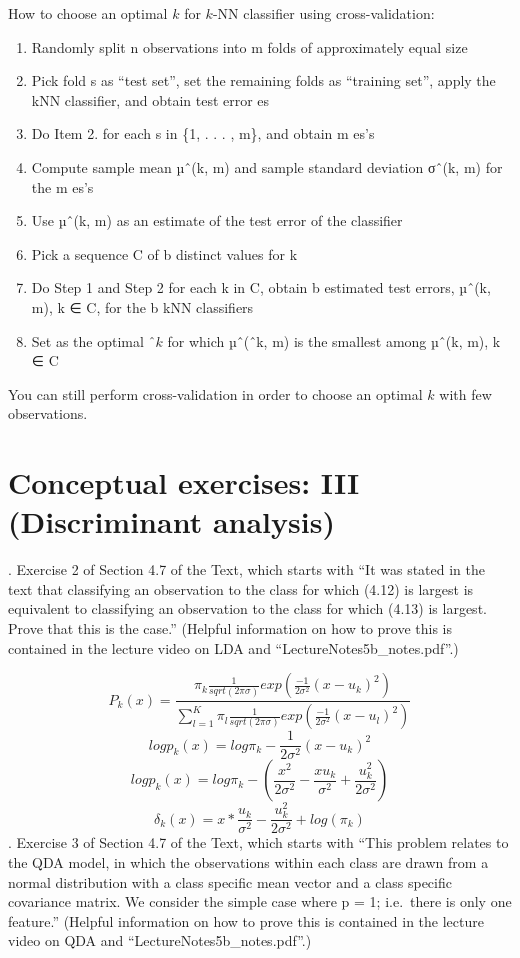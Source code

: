 \documentclass[
  11pt,
]{article}
\providecommand{\tightlist}{%
  \setlength{\itemsep}{0pt}\setlength{\parskip}{0pt}}
\begin{document}
How to choose an optimal \(k\) for \(k\)-NN classifier using
cross-validation:

\begin{enumerate}
\def\labelenumi{\arabic{enumi}.}
\tightlist
\item
  Randomly split n observations into m folds of approximately equal size
\item
  Pick fold s as ``test set'', set the remaining folds as ``training
  set'', apply the kNN classifier, and obtain test error es
\item
  Do Item 2. for each s in \{1, . . . , m\}, and obtain m es's
\item
  Compute sample mean µˆ(k, m) and sample standard deviation σˆ(k, m)
  for the m es's
\item
  Use µˆ(k, m) as an estimate of the test error of the classifier
\item
  Pick a sequence C of b distinct values for k
\item
  Do Step 1 and Step 2 for each k in C, obtain b estimated test errors,
  µˆ(k, m), k ∈ C, for the b kNN classifiers
\item
  Set as the optimal \(ˆk\) for which µˆ(ˆk, m) is the smallest among
  µˆ(k, m), k ∈ C
\end{enumerate}

You can still perform cross-validation in order to choose an optimal
\(k\) with few observations.

\hypertarget{conceptual-exercises-iii-discriminant-analysis}{%
\section{Conceptual exercises: III (Discriminant
analysis)}\label{conceptual-exercises-iii-discriminant-analysis}}

. Exercise 2 of Section 4.7 of the Text, which starts with ``It was
stated in the text that classifying an observation to the class for
which (4.12) is largest is equivalent to classifying an observation to
the class for which (4.13) is largest. Prove that this is the case.''
(Helpful information on how to prove this is contained in the lecture
video on LDA and ``LectureNotes5b\_notes.pdf''.)

\[P_k(x) = \frac{{\pi_k \frac{1}{sqrt(2\pi\sigma)}exp(\frac{-1}{2 \sigma^2}(x-u_k)^2)}} {\sum_{l = 1}^{K} \pi_l \frac{1}{sqrt(2\pi\sigma)}exp(\frac{-1}{2 \sigma^2}(x-u_l)^2)}\]
\[logp_k(x) = log\pi_k - \frac{1}{2\sigma^2} (x-u_k)^2\]
\[logp_k(x) = log\pi_k - (\frac{x^2}{2\sigma^2} - \frac{xu_k}{\sigma^2} + \frac{u^2_k}{2\sigma^2})\]
\[\delta_k(x) = x * \frac{u_k}{\sigma^2} - \frac{u^2_k}{2\sigma^2} + log(\pi_k)\]
. Exercise 3 of Section 4.7 of the Text, which starts with ``This
problem relates to the QDA model, in which the observations within each
class are drawn from a normal distribution with a class specific mean
vector and a class specific covariance matrix. We consider the simple
case where p = 1; i.e.~there is only one feature.'' (Helpful information
on how to prove this is contained in the lecture video on QDA and
``LectureNotes5b\_notes.pdf''.)
\end{document}
